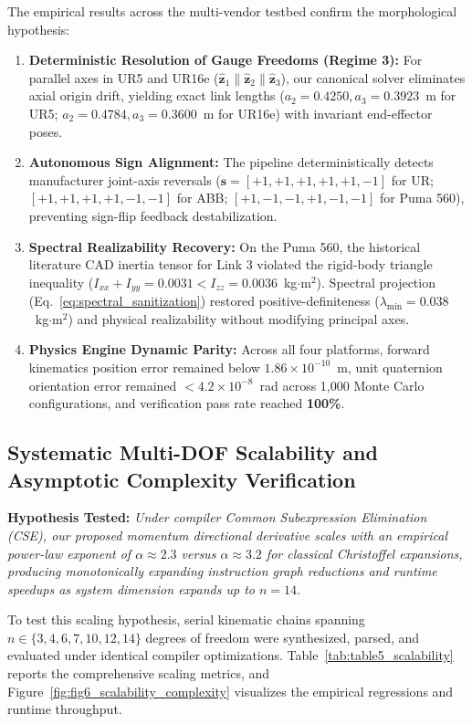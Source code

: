 \documentclass[fleqn,10pt]{article}
\begin{document}
	The empirical results across the multi-vendor testbed confirm the morphological hypothesis:
	\begin{enumerate}
		\item \textbf{Deterministic Resolution of Gauge Freedoms (Regime 3):} For parallel axes in UR5 and UR16e ($\hat{\bm{z}}_1 \parallel \hat{\bm{z}}_2 \parallel \hat{\bm{z}}_3$), our canonical solver eliminates axial origin drift, yielding exact link lengths ($a_2 = 0.4250, a_3 = 0.3923$~m for UR5; $a_2 = 0.4784, a_3 = 0.3600$~m for UR16e) with invariant end-effector poses.
		\item \textbf{Autonomous Sign Alignment:} The pipeline deterministically detects manufacturer joint-axis reversals ($\bm{s} = [+1, +1, +1, +1, +1, -1]$ for UR; $[+1, +1, +1, +1, -1, -1]$ for ABB; $[+1, -1, -1, +1, -1, -1]$ for Puma 560), preventing sign-flip feedback destabilization.
		\item \textbf{Spectral Realizability Recovery:} On the Puma 560, the historical literature CAD inertia tensor for Link 3 violated the rigid-body triangle inequality ($I_{xx} + I_{yy} = 0.0031 < I_{zz} = 0.0036$~kg$\cdot$m$^2$). Spectral projection (Eq.~\eqref{eq:spectral_sanitization}) restored positive-definiteness ($\lambda_{\min} = 0.038$~kg$\cdot$m$^2$) and physical realizability without modifying principal axes.
		\item \textbf{Physics Engine Dynamic Parity:} Across all four platforms, forward kinematics position error remained below $1.86 \times 10^{-10}$~m, unit quaternion orientation error remained $<4.2 \times 10^{-8}$~rad across 1,000 Monte Carlo configurations, and verification pass rate reached \textbf{100\%}.
	\end{enumerate}
	
	\subsection*{Systematic Multi-DOF Scalability and Asymptotic Complexity Verification}
	
	\noindent\textbf{Hypothesis Tested:} \textit{Under compiler Common Subexpression Elimination (CSE), our proposed momentum directional derivative scales with an empirical power-law exponent of $\alpha \approx 2.3$ versus $\alpha \approx 3.2$ for classical Christoffel expansions, producing monotonically expanding instruction graph reductions and runtime speedups as system dimension expands up to $n=14$.}
	
	To test this scaling hypothesis, serial kinematic chains spanning $n \in \{3, 4, 6, 7, 10, 12, 14\}$ degrees of freedom were synthesized, parsed, and evaluated under identical compiler optimizations. Table~\ref{tab:table5_scalability} reports the comprehensive scaling metrics, and Figure~\ref{fig:fig6_scalability_complexity} visualizes the empirical regressions and runtime throughput.
	
\end{document}
